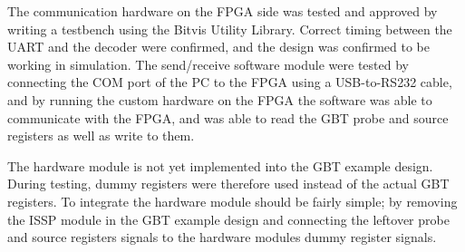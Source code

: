\documentclass[main.tex]{subfiles}
\begin{document}
The communication hardware on the FPGA side was tested and approved by writing a testbench using the Bitvis Utility Library. Correct timing between the UART and the decoder were confirmed, and the design was confirmed to be working in simulation. The send/receive software module were tested by connecting the COM port of the PC to the FPGA using a USB-to-RS232 cable, and by running the custom hardware on the FPGA the software was able to communicate with the FPGA, and was able to read the GBT probe and source registers as well as write to them. 

The hardware module is not yet implemented into the GBT example design. During testing, dummy registers were therefore used instead of the actual GBT registers. To integrate the hardware module should be fairly simple; by removing the ISSP module in the GBT example design and connecting the leftover probe and source registers signals to the hardware modules dummy register signals.
\end{document}
